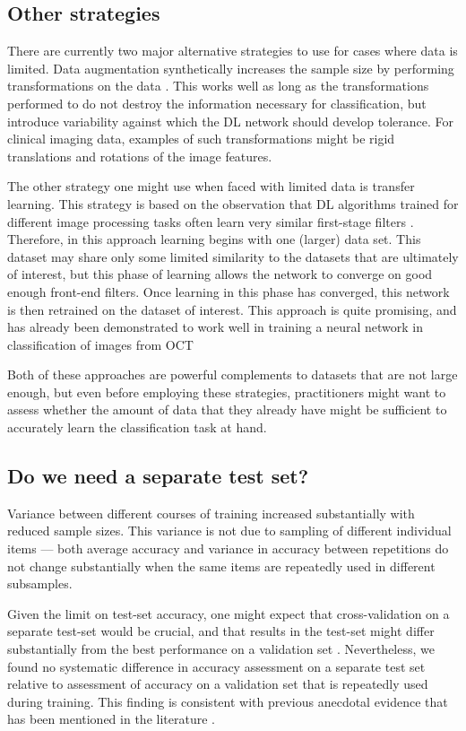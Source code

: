 \subsection{Other strategies}

There are currently two major alternative strategies to use for cases where data
is limited. Data augmentation synthetically increases the sample size by
performing transformations on the data \cite{Ciresan2011-ko}. This works well
as long as the transformations performed to do not destroy the information
necessary for classification, but introduce variability against which the DL
network should develop tolerance. For clinical imaging data, examples of such
transformations might be rigid translations and rotations of the image features.

The other strategy one might use when faced with limited data is transfer
learning. This strategy is based on the observation that DL algorithms trained
for different image processing tasks often learn very similar first-stage
filters \cite{Bengio2012-nh}. Therefore, in this approach learning begins with
one (larger) data set. This dataset may share only some limited similarity to
the datasets that are ultimately of interest, but this phase of learning allows
the network to converge on good enough front-end filters. Once learning in this
phase has converged, this network is then retrained on the dataset of interest.
This approach is quite promising, and has already been demonstrated to work
well in training a neural network in classification of images from OCT
\citep{Kermany2018-bq}

Both of these approaches are powerful complements to datasets that are not large
enough, but even before employing these strategies, practitioners might want to
assess whether the amount of data that they already have might be sufficient to
accurately learn the classification task at hand.

\subsection{Do we need a separate test set?}

Variance between different courses of training increased substantially with
reduced sample sizes. This variance is not due to sampling of different
individual items --- both average accuracy and variance in accuracy between
repetitions do not change substantially when the same items are repeatedly used
in different subsamples.

Given the limit on test-set accuracy, one might expect that cross-validation on
a separate test-set would be crucial, and that results in the test-set might
differ substantially from the best performance on a validation set
\cite{Zhang_2017}. Nevertheless, we found no systematic difference in
accuracy assessment on a separate test set relative to assessment of accuracy on
a validation set that is repeatedly used during training. This finding is
consistent with previous anecdotal evidence that has been mentioned in the
literature \cite{Krizhevsky2012-qc}.


